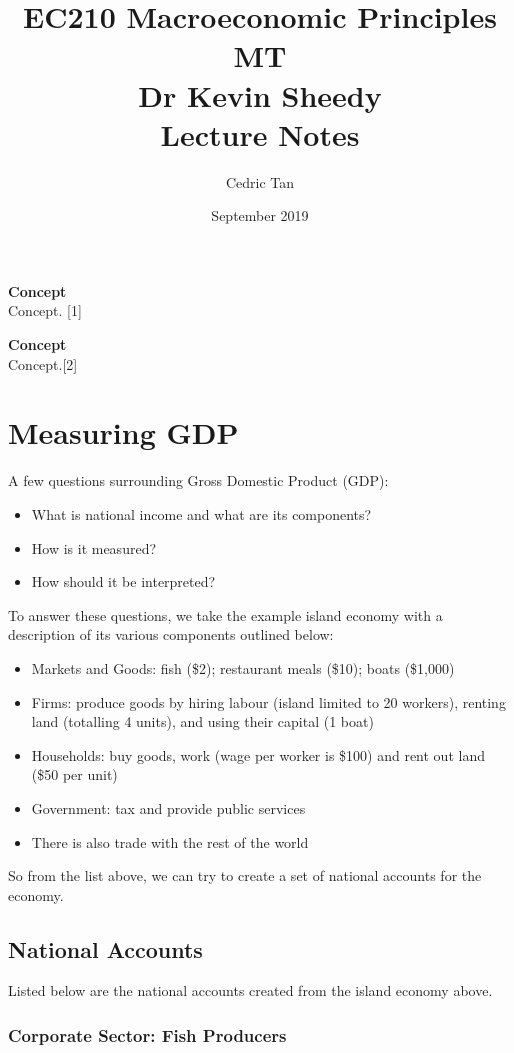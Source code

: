 \documentclass[12pt, letterpaper]{article}
\title{
	{EC210 Macroeconomic Principles MT}\\
	{\large{Dr Kevin Sheedy}}\\
	{\large{Lecture Notes}}
}
\author{Cedric Tan}
\date{September 2019}
\begin{document}
\maketitle
{\small
  \noindent\textbf{Concept}\\
  Concept. \hspace*{\fill}[1]

  \vspace{10pt}
  \noindent\textbf{Concept}\\
  Concept.\hspace*{\fill}[2]

\newpage
\tableofcontents
\newpage

\section{Measuring GDP}
A few questions surrounding Gross Domestic Product (GDP):
\begin{itemize}
	\item What is national income and what are its components?
	\item How is it measured?
	\item How should it be interpreted?
\end{itemize}
To answer these questions, we take the example island economy with a description of its various components outlined below:
\begin{itemize}
	\item Markets and Goods: fish (\$2); restaurant meals (\$10); boats (\$1,000)
	\item Firms: produce goods by hiring labour (island limited to 20 workers), renting land (totalling 4 units), and using their capital (1 boat)
	\item Households: buy goods, work (wage per worker is \$100) and rent out land (\$50 per unit)
	\item Government: tax and provide public services
	\item There is also trade with the rest of the world
\end{itemize}
So from the list above, we can try to create a set of national accounts for the economy.

\subsection{National Accounts}
Listed below are the national accounts created from the island economy above.

\subsubsection{Corporate Sector: Fish Producers}

}
\end{document}

